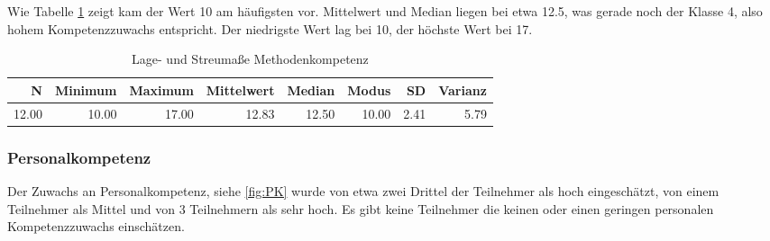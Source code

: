 \documentclass[12pt, bibliography=totoc]{scrartcl}
\begin{document}
Wie Tabelle \ref{tab:lMK} zeigt kam der Wert 10 am häufigsten vor.
Mittelwert und Median liegen bei etwa 12.5, was gerade noch der Klasse
4, also hohem Kompetenzzuwachs entspricht. Der niedrigste Wert lag bei
10, der höchste Wert bei 17.

\begin{table}[H]
\centering
\caption{Lage- und Streumaße Methodenkompetenz}
\label{tab:lMK}
\begin{tabular}{rrrrrrrr}
  \hline
  N & Minimum & Maximum & Mittelwert & Median & Modus & SD & Varianz \\
  \hline
  12.00 & 10.00 & 17.00 & 12.83 & 12.50 & 10.00 & 2.41 & 5.79 \\
   \hline
\end{tabular}
\end{table}

\subsubsection{Personalkompetenz}\label{personalkompetenz}

Der Zuwachs an Personalkompetenz, siehe \ref{fig:PK} wurde von etwa zwei
Drittel der Teilnehmer als hoch eingeschätzt, von einem Teilnehmer als
Mittel und von 3 Teilnehmern als sehr hoch. Es gibt keine Teilnehmer die
keinen oder einen geringen personalen Kompetenzzuwachs einschätzen.
\end{document}
